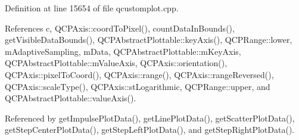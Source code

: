 Definition at line 15654 of file qcustomplot.\+cpp.



References c, Q\+C\+P\+Axis\+::coord\+To\+Pixel(), count\+Data\+In\+Bounds(), get\+Visible\+Data\+Bounds(), Q\+C\+P\+Abstract\+Plottable\+::key\+Axis(), Q\+C\+P\+Range\+::lower, m\+Adaptive\+Sampling, m\+Data, Q\+C\+P\+Abstract\+Plottable\+::m\+Key\+Axis, Q\+C\+P\+Abstract\+Plottable\+::m\+Value\+Axis, Q\+C\+P\+Axis\+::orientation(), Q\+C\+P\+Axis\+::pixel\+To\+Coord(), Q\+C\+P\+Axis\+::range(), Q\+C\+P\+Axis\+::range\+Reversed(), Q\+C\+P\+Axis\+::scale\+Type(), Q\+C\+P\+Axis\+::st\+Logarithmic, Q\+C\+P\+Range\+::upper, and Q\+C\+P\+Abstract\+Plottable\+::value\+Axis().



Referenced by get\+Impulse\+Plot\+Data(), get\+Line\+Plot\+Data(), get\+Scatter\+Plot\+Data(), get\+Step\+Center\+Plot\+Data(), get\+Step\+Left\+Plot\+Data(), and get\+Step\+Right\+Plot\+Data().


